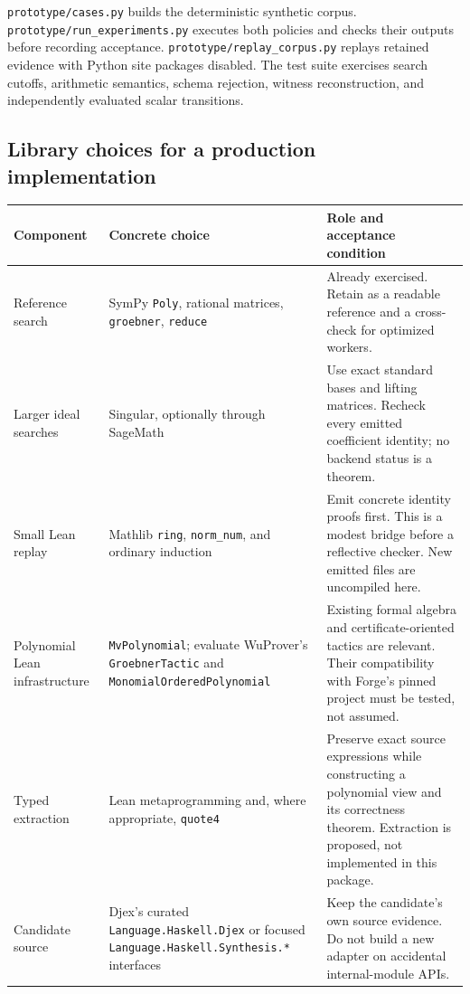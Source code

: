 \documentclass[11pt,letterpaper]{article}
\theoremstyle{definition}
\newcommand{\code}[1]{\nolinkurl{#1}}
\begin{document}
\code{prototype/cases.py} builds the deterministic synthetic corpus.
\code{prototype/run_experiments.py} executes both policies and checks their
outputs before recording acceptance. \code{prototype/replay_corpus.py} replays
retained evidence with Python site packages disabled. The test suite exercises
search cutoffs, arithmetic semantics, schema rejection, witness reconstruction,
and independently evaluated scalar transitions.

\subsection{Library choices for a production implementation}
\begin{longtable}{@{}p{.23\linewidth}p{.29\linewidth}p{.41\linewidth}@{}}
\toprule
Component & Concrete choice & Role and acceptance condition\\
\midrule\endhead
Reference search & SymPy \code{Poly}, rational matrices, \code{groebner},
\code{reduce} & Already exercised. Retain as a readable reference and a
cross-check for optimized workers.\\[.7em]
Larger ideal searches & Singular, optionally through SageMath & Use exact
standard bases and lifting matrices. Recheck every emitted coefficient identity;
no backend status is a theorem.\\[.7em]
Small Lean replay & Mathlib \code{ring}, \code{norm_num}, and ordinary induction
& Emit concrete identity proofs first. This is a modest bridge before a
reflective checker. New emitted files are uncompiled here.\\[.7em]
Polynomial Lean infrastructure & \code{MvPolynomial}; evaluate
WuProver's \code{GroebnerTactic} and \code{MonomialOrderedPolynomial} & Existing
formal algebra and certificate-oriented tactics are relevant. Their compatibility
with Forge's pinned project must be tested, not assumed.\\[.7em]
Typed extraction & Lean metaprogramming and, where appropriate,
\code{quote4} & Preserve exact source expressions while constructing a
polynomial view and its correctness theorem. Extraction is proposed, not
implemented in this package.\\[.7em]
Candidate source & Djex's curated \code{Language.Haskell.Djex} or focused
\code{Language.Haskell.Synthesis.*} interfaces & Keep the candidate's own
source evidence. Do not build a new adapter on accidental internal-module APIs.\\
\bottomrule
\end{longtable}
\end{document}
